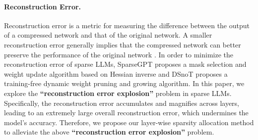 \paragraph{Reconstruction Error.} Reconstruction error is a metric for measuring the difference between the output of a compressed network and that of the original network. A smaller reconstruction error generally implies that the compressed network can better preserve the performance of the original network \citep{yun2021all, hubara2021accelerated, ma2023solving}. In order to minimize the reconstruction error of sparse LLMs, SparseGPT \citep{frantar2023sparsegpt} proposes a mask selection and weight update algorithm based on Hessian inverse and DSnoT \citep{zhang2023dynamic} proposes a training-free dynamic weight pruning and growing algorithm. In this paper, we explore the \textbf{``reconstruction error explosion''} problem in sparse LLMs. Specifically, the reconstruction error accumulates and magnifies across layers, leading to an extremely large overall reconstruction error, which undermines the model's accuracy. Therefore, we propose our layer-wise sparsity allocation method to alleviate the above \textbf{``reconstruction error explosion''} problem.